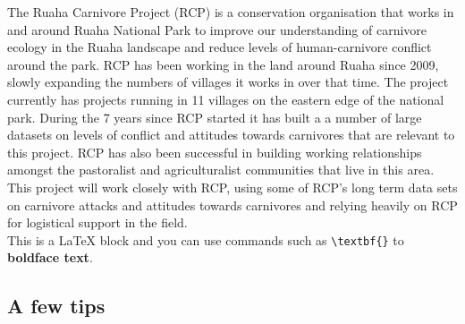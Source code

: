 The Ruaha Carnivore Project (RCP) is a conservation organisation that works in and around Ruaha National Park to improve our understanding of carnivore ecology in the Ruaha landscape and reduce levels of human-carnivore conflict around the park. RCP has been working in the land around Ruaha since 2009, slowly expanding the numbers of villages it works in over that time. The project currently has projects running in 11 villages on the eastern edge of the national park. During the 7 years since RCP started it has built a a number of large datasets on levels of conflict and attitudes towards carnivores that are relevant to this project. RCP has also been successful in building working relationships amongst the pastoralist and agriculturalist communities that live in this area. \\

This project will work closely with RCP, using some of RCP's long term data sets on carnivore attacks and attitudes towards carnivores and relying heavily on RCP for logistical support in the field.\\

This is a LaTeX block and you can use commands such as \verb|\textbf{}| to \textbf{boldface text}.

\subsection{A few tips}

